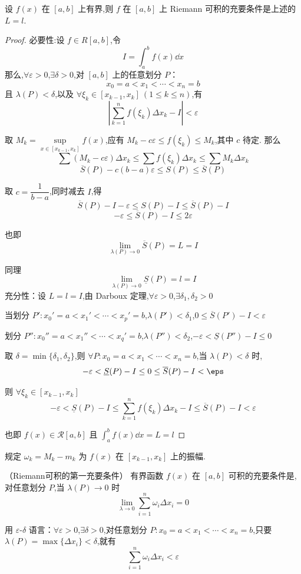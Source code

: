 \begin{proposition}
	设 $f(x)$ 在 $[a,b]$ 上有界,则 $f$ 在 $[a,b]$ 上 Riemann 可积的充要条件是上述的 $L=l$.
	
	
\end{proposition}
\begin{proof}
	必要性:设 $f \in R[a,b]$,令
	\[
	I = \int_a^b f(x) \dd x
	\]
	那么,$\forall \varepsilon>0$,$\exists \delta>0$,对 $[a,b]$ 上的任意划分 $P$：
	\[
	x_0 = a < x_1 < \cdots < x_n = b
	\]
	且 $\lambda(P) < \delta$,以及 $\forall \xi_k \in [x_{k-1}, x_k] \ (1 \leq k \leq n)$,有
	\[
	\left| \sum_{k=1}^n f(\xi_k) \Delta x_k - I \right| < \varepsilon
	\]
	
	取 $M_k = \sup\limits_{x \in [x_{k-1}, x_k]} f(x)$,应有 $M_k - c\varepsilon \leq f(\xi_k) \leq M_k$,其中 $c$ 待定.
	那么
	\[
	\sum (M_k - c\varepsilon) \Delta x_k \leq \sum f(\xi_k) \Delta x_k \leq \sum M_k \Delta x_k
	\]
	\[
	\overline{S}(P) - c(b-a)\varepsilon \leq S(P) \leq \overline{S}(P)
	\]
	
	取 $c = \dfrac{1}{b-a}$,同时减去 $I$,得
	\[
	\overline{S}(P) - I - \varepsilon \leq S(P) - I \leq \overline{S}(P) - I
	\]
	\[
	-\varepsilon \leq \overline{S}(P) - I \leq 2\varepsilon
	\]
	
	也即
	\[
	\lim_{\lambda(P) \to 0} \overline{S}(P) = L = I
	\]
	
	同理
	\[
	\lim_{\lambda(P) \to 0} \underline{S}(P) = l = I
	\]
	充分性：设 $L = l = I$,由 Darboux 定理,$\forall \varepsilon>0$,$\exists \delta_1, \delta_2 > 0$
	
	当划分 $P': x_0' = a < x_1' < \cdots < x_p' = b$,$\lambda(P') < \delta_1$,$0 \leq \overline{S}(P') - I < \varepsilon$
	
	划分 $P'': x_0'' = a < x_1'' < \cdots < x_q' = b$,$\lambda(P'') < \delta_2$,$-\varepsilon < \underline{S}(P'') - I \leq 0$
	
	取 $\delta = \min\{\delta_1, \delta_2\}$,则 $\forall P: x_0 = a < x_1 < \cdots < x_n = b$,当 $\lambda(P) < \delta$ 时,
	\[
	-\varepsilon < \underline{S}(P) - I \leq 0 \leq \overline{S}(P) - I<\eps
	\]
	
	则 $\forall \xi_k \in [x_{k-1}, x_k]$
	\[
	-\varepsilon < \underline{S}(P) - I \leq \sum_{k=1}^n f(\xi_k) \Delta x_k - I \leq \overline{S}(P) - I < \varepsilon
	\]
	
	也即 $f(x) \in \mathcal{R}[a,b]$ 且 $\int_a^b f(x) \dd x = L = l$
\end{proof}
规定 $\omega_k = M_k - m_k$ 为 $f(x)$ 在 $[x_{k-1}, x_k]$ 上的振幅.
\begin{theorem}（Riemann可积的第一充要条件）\label{Riemann可积的第一充要条件}
	有界函数 $f(x)$ 在 $[a,b]$ 可积的充要条件是,对任意划分 $P$,当 $\lambda(P) \to 0$ 时
	\[
	\lim_{\lambda \to 0} \sum_{i=1}^n \omega_i \Delta x_i = 0
	\]
	
	用 $\varepsilon$-$\delta$ 语言：$\forall \varepsilon>0$,$\exists \delta>0$,对任意划分 $P: x_0 = a < x_1 < \cdots < x_n = b$,只要
	$\lambda(P) = \max\{\Delta x_i\} < \delta$,就有
	\[
	\sum_{i=1}^n \omega_i \Delta x_i < \varepsilon
	\]
\end{theorem}

